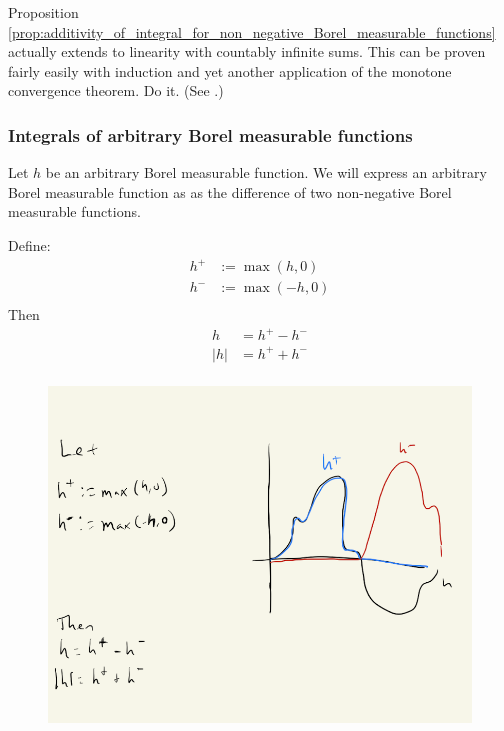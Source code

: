 \documentclass{article} %
\begin{document}
\begin{exercise}
Proposition \ref{prop:additivity_of_integral_for_non_negative_Borel_measurable_functions} actually extends to linearity with countably infinite sums.  This can be proven fairly easily with induction and yet another application of the monotone convergence theorem. Do it. (See \cite{folland1999real}.)  
\end{exercise}






\subsubsection{Integrals of arbitrary Borel measurable functions}

Let $h$ be an arbitrary Borel measurable function.   We will express an arbitrary Borel measurable function as as the difference of two non-negative Borel measurable functions.

Define:
\begin{align*}
h^+ &:= \max (h,0) \\
h^- &:= \max (-h,0) \\	
\end{align*}
Then 
\begin{align*}
h &= h^+ - h^- \\
|h| &= h^+ + h^- \\	
\end{align*}

\begin{figure}[H]
\centering
\includegraphics[width=.7\textwidth]{images/arbitrary_borel_measurable_functions_in_terms_of_nonnegative_borel_measurable_functions}
\end{figure}
\end{document}
